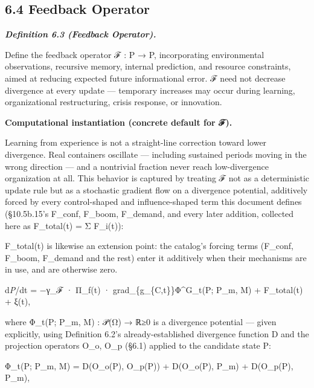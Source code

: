 \documentclass[
]{article}
\begin{document}
\hypertarget{feedback-operator}{%
\subsection{6.4 Feedback Operator}\label{feedback-operator}}

\emph{\textbf{Definition 6.3 (Feedback Operator).}}

Define the feedback operator ℱ : P → P, incorporating environmental
observations, recursive memory, internal prediction, and resource
constraints, aimed at reducing expected future informational error. ℱ
need not decrease divergence at every update --- temporary increases may
occur during learning, organizational restructuring, crisis response, or
innovation.

\textbf{Computational instantiation (concrete default for ℱ).}

Learning from experience is not a straight-line correction toward lower
divergence. Real containers oscillate --- including sustained periods
moving in the wrong direction --- and a nontrivial fraction never reach
low-divergence organization at all. This behavior is captured by
treating ℱ not as a deterministic update rule but as a stochastic
gradient flow on a divergence potential, additively forced by every
control-shaped and influence-shaped term this document defines
(§10.5b.15's F\_conf, F\_boom, F\_demand, and every later addition,
collected here as F\_total(t) = Σ F\_i(t)):

F\_total(t) is likewise an extension point: the catalog's forcing terms
(F\_conf, F\_boom, F\_demand and the rest) enter it additively when
their mechanisms are in use, and are otherwise zero.

d\emph{P}/dt = −γ\_ℱ · Π\_f(t) · grad\_\{g\_\{C,t\}\}Φ\^{}G\_t(P; P\_m,
M) + F\_total(t) + ξ(t),

where Φ\_t(P; P\_m, M) : 𝒫(Ω) → ℝ≥0 is a divergence potential --- given
explicitly, using Definition 6.2's already-established divergence
function D and the projection operators O\_o, O\_p (§6.1) applied to the
candidate state P:

Φ\_t(P; P\_m, M) = D(O\_o(P), O\_p(P)) + D(O\_o(P), P\_m) + D(O\_p(P),
P\_m),
\end{document}
